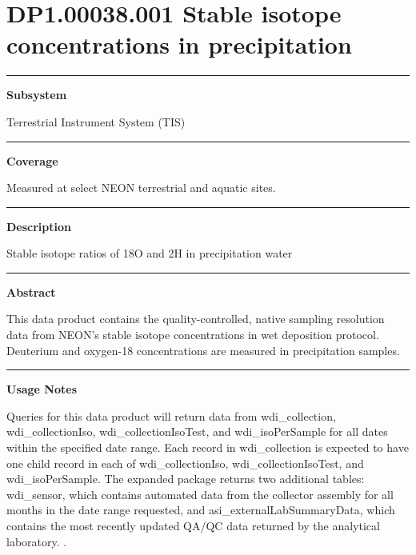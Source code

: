 \documentclass[]{article}
\begin{document}
\section{DP1.00038.001 Stable isotope concentrations in
precipitation}\label{dp1.00038.001-stable-isotope-concentrations-in-precipitation}

\begin{center}\rule{0.5\linewidth}{\linethickness}\end{center}

\textbf{Subsystem}

Terrestrial Instrument System (TIS)

\begin{center}\rule{0.5\linewidth}{\linethickness}\end{center}

\textbf{Coverage}

Measured at select NEON terrestrial and aquatic sites.

\begin{center}\rule{0.5\linewidth}{\linethickness}\end{center}

\textbf{Description}

Stable isotope ratios of 18O and 2H in precipitation water

\begin{center}\rule{0.5\linewidth}{\linethickness}\end{center}

\textbf{Abstract}

This data product contains the quality-controlled, native sampling
resolution data from NEON's stable isotope concentrations in wet
deposition protocol. Deuterium and oxygen-18 concentrations are measured
in precipitation samples.

\begin{center}\rule{0.5\linewidth}{\linethickness}\end{center}

\textbf{Usage Notes}

Queries for this data product will return data from wdi\_collection,
wdi\_collectionIso, wdi\_collectionIsoTest, and wdi\_isoPerSample for
all dates within the specified date range. Each record in
wdi\_collection is expected to have one child record in each of
wdi\_collectionIso, wdi\_collectionIsoTest, and wdi\_isoPerSample. The
expanded package returns two additional tables: wdi\_sensor, which
contains automated data from the collector assembly for all months in
the date range requested, and asi\_externalLabSummaryData, which
contains the most recently updated QA/QC data returned by the analytical
laboratory. \newpage
.
\end{document}
